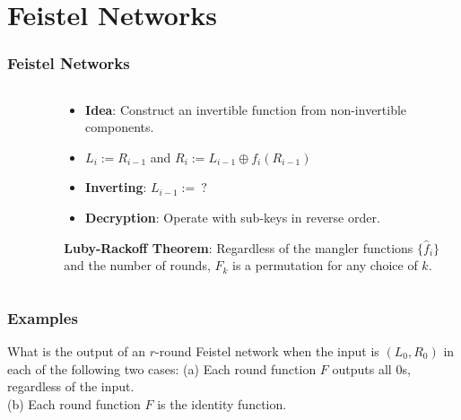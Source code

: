 \section{Feistel Networks}
\begin{frame}\frametitle{Feistel Networks}
\begin{columns}[t]
\begin{column}{4cm}
\begin{figure}
\begin{center}

\end{center}
\end{figure}
\end{column}
\begin{column}{6cm}
\begin{itemize}
\item \textbf{Idea}: Construct an invertible function from non-invertible components.
\item $L_i := R_{i-1}$ and $R_i := L_{i-1} \oplus f_i(R_{i-1})$
\item \alert{\textbf{Inverting}: $L_{i-1} :=\ ?$} %
\item \textbf{Decryption}: Operate with sub-keys in reverse order.
\end{itemize}
\begin{proposition}
\textbf{Luby-Rackoff Theorem}: Regardless of the mangler functions $\{\hat{f}_i\}$ and the number of rounds, $F_k$ is a permutation for any choice of $k$.
\end{proposition}
\end{column}
\end{columns}
\end{frame}
\begin{frame}\frametitle{Examples}
\begin{exampleblock}{What is the output of an $r$-round Feistel network when the input is $(L_0, R_0)$ in each of the following two cases:}
(a) Each round function $F$ outputs all $0$s, regardless of the input.\\
(b) Each round function $F$ is the identity function.
\end{exampleblock}
\end{frame}
